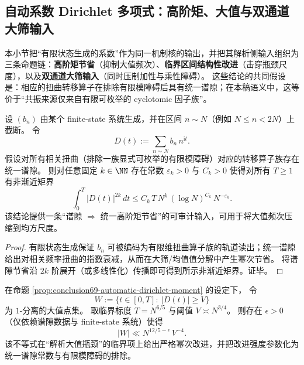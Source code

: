 \subsection{自动系数 Dirichlet 多项式：高阶矩、大值与双通道大筛输入}\label{subsec:automatic-dirichlet-polynomial-large-sieve}

本小节把“有限状态生成的系数”作为同一机制核的输出，并把其解析侧输入组织为三条命题链：\textbf{高阶矩节省}（抑制大值频次）、\textbf{临界区间结构性改进}（击穿瓶颈尺度），以及\textbf{双通道大筛输入}（同时压制加性与乘性障碍）。
这些结论的共同假设是：相应的扭曲转移算子在排除有限模障碍后具有统一谱隙；在本稿语义中，这等价于“共振来源仅来自有限可枚举的 cyclotomic 因子族”。

\begin{proposition}\label{prop:conclusion69-automatic-dirichlet-moment}
设 \((b_n)\) 由某个 finite-state 系统生成，并在区间 \(n\sim N\)（例如 \(N\le n<2N\)）上截断。
令
\[
D(t):=\sum_{n\sim N} b_n\,n^{\mathrm{i}t}.
\]
假设对所有相关扭曲（排除一族显式可枚举的有限模障碍）对应的转移算子族存在统一谱隙。
则对任意固定 \(k\in\NN\) 存在常数 \(\varepsilon_k>0\) 与 \(C_k>0\) 使得对所有 \(T\ge 1\) 有非渐近矩界
\[
\boxed{\;
\int_0^T |D(t)|^{2k}\,dt
\le C_k\,T\,N^{k}\,(\log N)^{C_k}\,N^{-\varepsilon_k}.\;}
\]
该结论提供一条“谱隙 \(\Rightarrow\) 统一高阶矩节省”的可审计输入，可用于将大值频次压缩到均方尺度。
\end{proposition}

\begin{proof}
有限状态生成保证 \(b_n\) 可被编码为有限维扭曲算子族的轨道读出；统一谱隙给出对相关频率扭曲的指数衰减，从而在大筛/均值值分解中产生幂次节省。
将谱隙节省沿 \(2k\) 阶展开（或多线性化）传播即可得到所示非渐近矩界。证毕。
\end{proof}

\begin{theorem}\label{thm:conclusion70-critical-interval-structure-improvement}
在命题 \ref{prop:conclusion69-automatic-dirichlet-moment} 的设定下，
令
\[
W:=\{t\in[0,T]:\ |D(t)|\ge V\}
\]
为 \(1\)-分离的大值点集。
取临界标度 \(T=N^{6/5}\) 与阈值 \(V\asymp N^{3/4}\)。
则存在 \(\epsilon>0\)（仅依赖谱隙数据与 finite-state 系统）使得
\[
\boxed{\;
|W|\ll N^{12/5-\epsilon}\,V^{-4}.\;}
\]
该不等式在“解析大值瓶颈”的临界项上给出严格幂次改进，并把改进强度参数化为统一谱隙常数与有限模障碍的排除。
\end{theorem}

